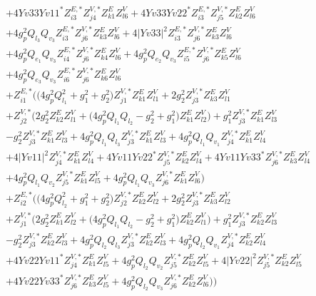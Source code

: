 \begin{align}
 &+4 Yv33 Yv11^* Z^{E,*}_{i 3} Z^{V,*}_{j 4} Z_{{k 1}}^{E} Z_{{l 6}}^{V} +4 Yv33 Yv22^* Z^{E,*}_{i 3} Z^{V,*}_{j 5} Z_{{k 2}}^{E} Z_{{l 6}}^{V} \nonumber \\ 
 &+4 g_{p}^{2} Q_{l_3} Q_{v_3} Z^{E,*}_{i 3} Z^{V,*}_{j 6} Z_{{k 3}}^{E} Z_{{l 6}}^{V} +4 |Yv33|^2 Z^{E,*}_{i 3} Z^{V,*}_{j 6} Z_{{k 3}}^{E} Z_{{l 6}}^{V} \nonumber \\ 
 &+4 g_{p}^{2} Q_{e_{1}} Q_{v_3} Z^{E,*}_{i 4} Z^{V,*}_{j 6} Z_{{k 4}}^{E} Z_{{l 6}}^{V} +4 g_{p}^{2} Q_{e_{2}} Q_{v_3} Z^{E,*}_{i 5} Z^{V,*}_{j 6} Z_{{k 5}}^{E} Z_{{l 6}}^{V} \nonumber \\ 
 &+4 g_{p}^{2} Q_{e_3} Q_{v_3} Z^{E,*}_{i 6} Z^{V,*}_{j 6} Z_{{k 6}}^{E} Z_{{l 6}}^{V} \nonumber \\ 
 &+Z^{E,*}_{i 1} \Big(\Big(4 g_{p}^{2} Q_{l_1}^{2}  + g_{1}^{2} + g_{2}^{2}\Big)Z^{V,*}_{j 1} Z_{{k 1}}^{E} Z_{{l 1}}^{V} +2 g_{2}^{2} Z^{V,*}_{j 3} Z_{{k 3}}^{E} Z_{{l 1}}^{V} \nonumber \\ 
 &+Z^{V,*}_{j 2} \Big(2 g_{2}^{2} Z_{{k 2}}^{E} Z_{{l 1}}^{V}  + \Big(4 g_{p}^{2} Q_{l_1} Q_{l_2}  - g_{2}^{2}  + g_{1}^{2}\Big)Z_{{k 1}}^{E} Z_{{l 2}}^{V} \Big)+g_{1}^{2} Z^{V,*}_{j 3} Z_{{k 1}}^{E} Z_{{l 3}}^{V} \nonumber \\ 
 &- g_{2}^{2} Z^{V,*}_{j 3} Z_{{k 1}}^{E} Z_{{l 3}}^{V} +4 g_{p}^{2} Q_{l_1} Q_{l_3} Z^{V,*}_{j 3} Z_{{k 1}}^{E} Z_{{l 3}}^{V} +4 g_{p}^{2} Q_{l_1} Q_{v_1} Z^{V,*}_{j 4} Z_{{k 1}}^{E} Z_{{l 4}}^{V} \nonumber \\ 
 &+4 |Yv11|^2 Z^{V,*}_{j 4} Z_{{k 1}}^{E} Z_{{l 4}}^{V} +4 Yv11 Yv22^* Z^{V,*}_{j 5} Z_{{k 2}}^{E} Z_{{l 4}}^{V} +4 Yv11 Yv33^* Z^{V,*}_{j 6} Z_{{k 3}}^{E} Z_{{l 4}}^{V} \nonumber \\ 
 &+4 g_{p}^{2} Q_{l_1} Q_{v_2} Z^{V,*}_{j 5} Z_{{k 1}}^{E} Z_{{l 5}}^{V} +4 g_{p}^{2} Q_{l_1} Q_{v_3} Z^{V,*}_{j 6} Z_{{k 1}}^{E} Z_{{l 6}}^{V} \Big)\nonumber \\ 
 &+Z^{E,*}_{i 2} \Big(\Big(4 g_{p}^{2} Q_{l_2}^{2}  + g_{1}^{2} + g_{2}^{2}\Big)Z^{V,*}_{j 2} Z_{{k 2}}^{E} Z_{{l 2}}^{V} +2 g_{2}^{2} Z^{V,*}_{j 3} Z_{{k 3}}^{E} Z_{{l 2}}^{V} \nonumber \\ 
 &+Z^{V,*}_{j 1} \Big(2 g_{2}^{2} Z_{{k 1}}^{E} Z_{{l 2}}^{V}  + \Big(4 g_{p}^{2} Q_{l_1} Q_{l_2}  - g_{2}^{2}  + g_{1}^{2}\Big)Z_{{k 2}}^{E} Z_{{l 1}}^{V} \Big)+g_{1}^{2} Z^{V,*}_{j 3} Z_{{k 2}}^{E} Z_{{l 3}}^{V} \nonumber \\ 
 &- g_{2}^{2} Z^{V,*}_{j 3} Z_{{k 2}}^{E} Z_{{l 3}}^{V} +4 g_{p}^{2} Q_{l_2} Q_{l_3} Z^{V,*}_{j 3} Z_{{k 2}}^{E} Z_{{l 3}}^{V} +4 g_{p}^{2} Q_{l_2} Q_{v_1} Z^{V,*}_{j 4} Z_{{k 2}}^{E} Z_{{l 4}}^{V} \nonumber \\ 
 &+4 Yv22 Yv11^* Z^{V,*}_{j 4} Z_{{k 1}}^{E} Z_{{l 5}}^{V} +4 g_{p}^{2} Q_{l_2} Q_{v_2} Z^{V,*}_{j 5} Z_{{k 2}}^{E} Z_{{l 5}}^{V} +4 |Yv22|^2 Z^{V,*}_{j 5} Z_{{k 2}}^{E} Z_{{l 5}}^{V} \nonumber \\ 
 &+4 Yv22 Yv33^* Z^{V,*}_{j 6} Z_{{k 3}}^{E} Z_{{l 5}}^{V} +4 g_{p}^{2} Q_{l_2} Q_{v_3} Z^{V,*}_{j 6} Z_{{k 2}}^{E} Z_{{l 6}}^{V} \Big)\Big)\end{align} 
